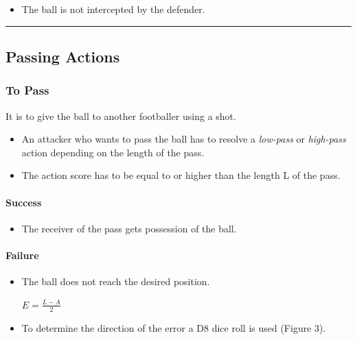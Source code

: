 \documentclass[12pt]{article}
\begin{document}
\begin{rulebox}
\begin{itemize}
\item The ball is not intercepted by the defender.
\end{itemize}
\end{rulebox}

\bigskip\hrule\bigskip

\subsection{Passing Actions}

\subsubsection{To Pass}
It is to give the ball to another footballer using a shot.

\begin{rulebox}
\begin{itemize}
\item An attacker who wants to pass the ball has to resolve a \emph{low-pass} or \emph{high-pass} action depending on the length of the pass.
\item The action score has to be equal to or higher than the length L of the pass.
\end{itemize}
\end{rulebox}

\paragraph{Success}

\begin{rulebox}
\begin{itemize}
\item The receiver of the pass gets possession of the ball.
\end{itemize}
\end{rulebox}

\paragraph{Failure}

\begin{rulebox}
\begin{itemize}
\item The ball does not reach the desired position.
\begin{formulabox}
$E = \frac{L - A}{2}$
\end{formulabox}
\item To determine the direction of the error a D8 dice roll is used (Figure 3).
\end{itemize}
\end{rulebox}
\end{document}
